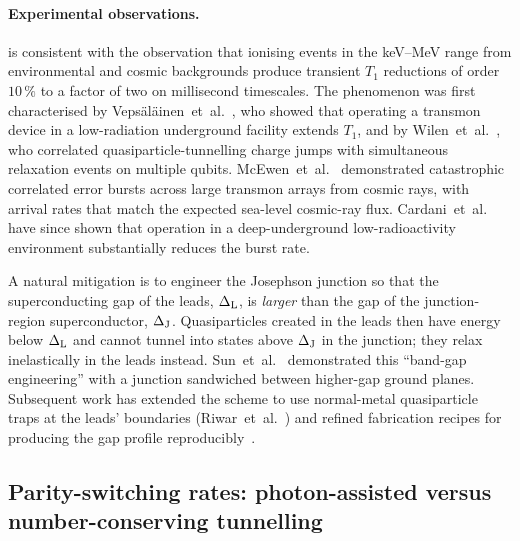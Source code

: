 \paragraph{Experimental observations.}
 is consistent with the observation that
ionising events in the keV--MeV range from environmental and
cosmic backgrounds produce transient $T_1$ reductions of order
$10\,\%$ to a factor of two on millisecond timescales. The
phenomenon was first characterised by
Vepsäläinen~et~al.~\cite{vepsalainen2020}, who showed that
operating a transmon device in a low-radiation underground
facility extends $T_1$, and by
Wilen~et~al.~\cite{wilen2021}, who correlated
quasiparticle-tunnelling charge jumps with simultaneous
relaxation events on multiple qubits.
McEwen~et~al.~\cite{mcewen2022} demonstrated catastrophic
correlated error bursts across large transmon arrays from cosmic
rays, with arrival rates that match the expected sea-level
cosmic-ray flux. Cardani~et~al.~\cite{cardani2021} have since
shown that operation in a deep-underground low-radioactivity
environment substantially reduces the burst rate.

\begin{remark}
\label{rem:gap-engineering}
A natural mitigation is to engineer the Josephson junction so
that the superconducting gap of the leads, $\Delta_{\rm L}$, is
\emph{larger} than the gap of the junction-region superconductor,
$\Delta_{\rm J}$. Quasiparticles created in the leads then have
energy below $\Delta_{\rm L}$ and cannot tunnel into states above
$\Delta_{\rm J}$ in the junction; they relax inelastically in the
leads instead. Sun~et~al.~\cite{sun2012} demonstrated this
``band-gap engineering'' with a junction sandwiched between
higher-gap ground planes. Subsequent work has extended the scheme
to use normal-metal quasiparticle traps at the leads' boundaries
(Riwar~et~al.~\cite{riwar2016}) and refined fabrication recipes
for producing the gap profile reproducibly~\cite{pan2022}.
\end{remark}

\subsection{Parity-switching rates: photon-assisted versus number-conserving tunnelling}
\label{sec:parity-switching}

